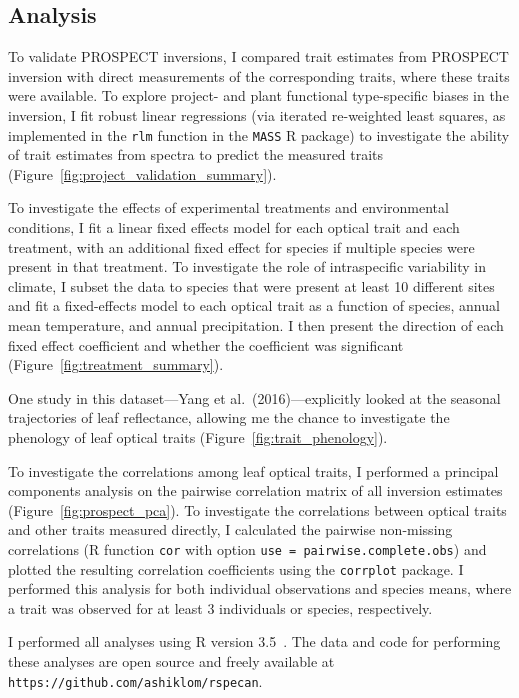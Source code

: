 \subsection{Analysis}

To validate PROSPECT inversions, I compared trait estimates from PROSPECT inversion with direct measurements of the corresponding traits, where these traits were available.
To explore project- and plant functional type-specific biases in the inversion, I fit robust linear regressions (via iterated re-weighted least squares, as implemented in the \texttt{rlm} function in the \texttt{MASS} R package) to investigate the ability of trait estimates from spectra to predict the measured traits (Figure~\ref{fig:project_validation_summary}).

To investigate the effects of experimental treatments and environmental conditions, I fit a linear fixed effects model for each optical trait and each treatment, with an additional fixed effect for species if multiple species were present in that treatment.
To investigate the role of intraspecific variability in climate, I subset the data to species that were present at least 10 different sites and fit a fixed-effects model to each optical trait as a function of species, annual mean temperature, and annual precipitation.
I then present the direction of each fixed effect coefficient and whether the coefficient was significant (Figure~\ref{fig:treatment_summary}).

One study in this dataset---Yang et al.~(2016)\nocite{yang_2016_seasonal}---explicitly looked at the seasonal trajectories of leaf reflectance, allowing me the chance to investigate the phenology of leaf optical traits (Figure~\ref{fig:trait_phenology}).

To investigate the correlations among leaf optical traits, I performed a principal components analysis on the pairwise correlation matrix of all inversion estimates (Figure~\ref{fig:prospect_pca}).
To investigate the correlations between optical traits and other traits measured directly, I calculated the pairwise non-missing correlations (R function \texttt{cor} with option \texttt{use = pairwise.complete.obs}) and plotted the resulting correlation coefficients using the \texttt{corrplot} package.
I performed this analysis for both individual observations and species means, where a trait was observed for at least 3 individuals or species, respectively.

I performed all analyses using R version 3.5~\cite{rstats}.
The data and code for performing these analyses are open source and freely available at \\ \texttt{https://github.com/ashiklom/rspecan}.
